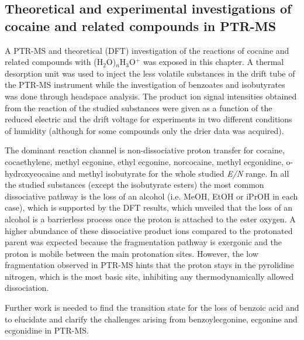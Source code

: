 \subsection{Theoretical and experimental investigations of cocaine and related compounds
in PTR-MS}

A PTR-MS and theoretical (DFT) investigation of the reactions of cocaine and related compounds with (H$_2$O)$_n$H$_3$O$^+$ was exposed in this chapter.
%
A thermal desorption unit was used to inject the less volatile substances in the drift tube of the PTR-MS instrument while the investigation of benzoates and isobutyrates was done through headspace analysis.
%
The product ion signal intensities obtained from the reaction of the studied substances were given as a function of the reduced electric and the drift voltage for experiments in two different conditions of humidity (although for some compounds only the drier data was acquired).

The dominant reaction channel is non-dissociative proton transfer for cocaine, cocaethylene, methyl ecgonine, ethyl ecgonine, norcocaine, methyl ecgonidine, o-hydroxycocaine and methyl isobutyrate for the whole studied \textit{E/N} range.
%
In all the studied substances  (except the isobutyrate esters) the most common dissociative pathway is the loss of an alcohol (i.e. MeOH, EtOH or iPrOH in each case), which is supported by the DFT results, which unveiled that the loss of an alcohol is a barrierless process once the proton is attached to the 
ester oxygen.
%
A higher abundance of these dissociative product ions compared to the protonated parent was expected because the fragmentation pathway is exergonic and the proton is mobile between the main protonation sites.
%
However, the low fragmentation observed in PTR-MS  hints that the proton stays in the pyrolidine nitrogen, which is the most basic site, inhibiting any thermodynamically allowed dissociation.

%



Further work is needed to find the transition state for the loss of benzoic acid and to elucidate and clarify the challenges arising from  benzoylecgonine, ecgonine and ecgonidine in PTR-MS.



